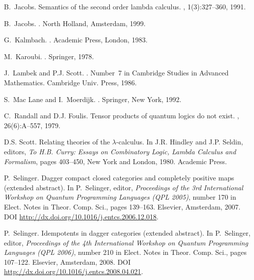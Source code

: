 \documentclass{article}
\begin{document}
\begin{thebibliography}{10}
B.~Jacobs.
\newblock Semantics of the second order lambda calculus.
, 1(3):327--360, 1991.

B.~Jacobs.
.
\newblock North Holland, Amsterdam, 1999.

G.~Kalmbach.
.
\newblock Academic Press, London, 1983.

M.~Karoubi.
.
\newblock Springer, 1978.

J.~Lambek and P.J. Scott.
.
\newblock Number~7 in Cambridge Studies in Advanced Mathematics. Cambridge
  Univ. Press, 1986.

S.~Mac Lane and I.~Moerdijk.
.
\newblock Springer, New York, 1992.

C.~Randall and D.J. Foulis.
\newblock Tensor products of quantum logics do not exist.
, 26(6):A--557, 1979.

D.S. Scott.
\newblock Relating theories of the $\lambda$-calculus.
\newblock In J.R. Hindley and J.P. Seldin, editors, {\em To H.B. Curry: Essays
  on Combinatory Logic, Lambda Calculus and Formalism}, pages 403--450, New
  York and London, 1980. Academic Press.

P.~Selinger.
\newblock Dagger compact closed categories and completely positive maps
  (extended abstract).
\newblock In P.~Selinger, editor, {\em Proceedings of the 3rd International
  Workshop on Quantum Programming Languages (QPL 2005)}, number 170 in Elect.
  Notes in Theor. Comp. Sci., pages 139--163. Elsevier, Amsterdam, 2007.
\newblock DOI \url{http://dx.doi.org/10.1016/j.entcs.2006.12.018}.

P.~Selinger.
\newblock Idempotents in dagger categories (extended abstract).
\newblock In P.~Selinger, editor, {\em Proceedings of the 4th International
  Workshop on Quantum Programming Languages (QPL 2006)}, number 210 in Elect.
  Notes in Theor. Comp. Sci., pages 107--122. Elsevier, Amsterdam, 2008.
\newblock DOI \url{http://dx.doi.org/10.1016/j.entcs.2008.04.021}.

\end{thebibliography}
\end{document}
